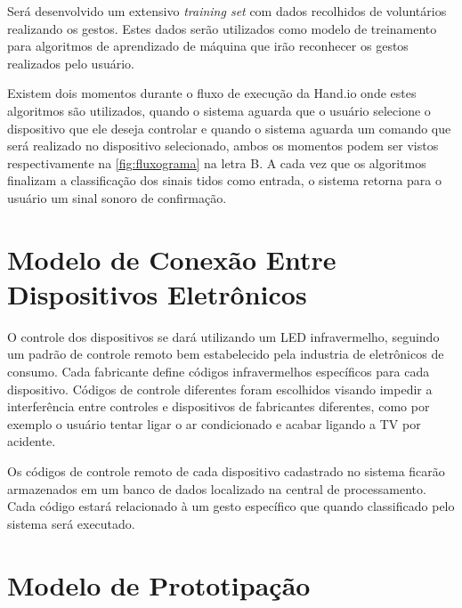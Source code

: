 Será desenvolvido um extensivo \textit{training set} com dados recolhidos de voluntários realizando os gestos. Estes dados serão utilizados como modelo de treinamento para algoritmos de aprendizado de máquina que irão reconhecer os gestos realizados pelo usuário.



Existem dois momentos durante o fluxo de execução da Hand.io onde estes algoritmos são utilizados, quando o sistema aguarda que o usuário selecione o dispositivo que ele deseja controlar e quando o sistema aguarda um comando que será realizado no dispositivo selecionado, ambos os momentos podem ser vistos respectivamente na \autoref{fig:fluxograma} na letra B. A cada vez que os algoritmos finalizam a classificação dos sinais tidos como entrada, o sistema retorna para o usuário um sinal sonoro de confirmação. 




\section{Modelo de Conexão Entre Dispositivos Eletrônicos}

O controle dos dispositivos se dará utilizando um LED infravermelho, seguindo um padrão de controle remoto bem estabelecido pela industria de eletrônicos de consumo. Cada fabricante define códigos infravermelhos específicos para cada dispositivo. Códigos de controle diferentes foram escolhidos visando impedir a interferência entre controles e dispositivos de fabricantes diferentes, como por exemplo o usuário tentar ligar o ar condicionado e acabar ligando a TV por acidente.

Os códigos de controle remoto de cada dispositivo cadastrado no sistema ficarão armazenados em um banco de dados localizado na central de processamento. Cada código estará relacionado à um gesto específico que quando classificado pelo sistema será executado.



\section{Modelo de Prototipação}

